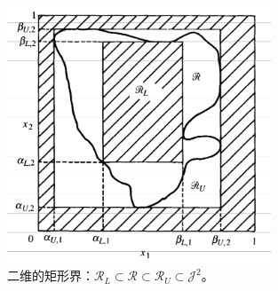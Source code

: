 \begin{figure}[!ht]
\centering
\includegraphics[width=0.7\textwidth]{images/hyperrectangle.png}
\caption{二维的矩形界：$\mathscr{R}_L \subset \mathscr{R} \subset
  \mathscr{R}_U \subset \mathscr{J}^2$。}
\label{fig::hyperrectangle2D}
\end{figure}

